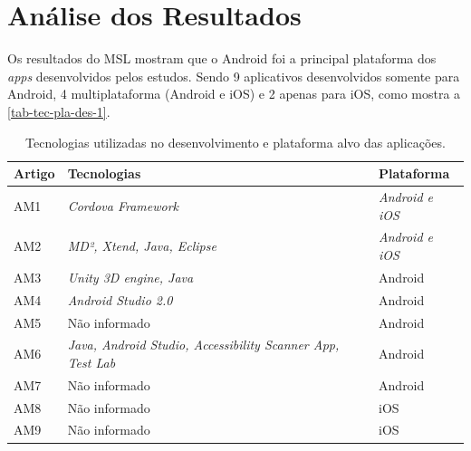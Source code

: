 \newpage

\section{Análise dos Resultados}

Os resultados do MSL mostram que o Android foi a principal plataforma dos \emph{apps} desenvolvidos pelos estudos.
Sendo 9 aplicativos desenvolvidos somente para Android, 4 multiplataforma (Android e iOS) e 2
apenas para iOS, como mostra a \autoref{tab-tec-pla-des-1}.

\begin{table}[htb]
    \begin{center}
        \caption{Tecnologias utilizadas no desenvolvimento e plataforma alvo das aplicações.}
        \label{tab-tec-pla-des-1}
        \begin{tabular}{p{1.0cm}|p{8.0cm}|p{3.0cm}}
            \textbf{Artigo} & \textbf{Tecnologias}                                             & \textbf{Plataforma}  \\
            \hline
            AM1             & \emph{Cordova Framework}                                         & \emph{Android e iOS} \\
            \hline
            AM2             & \emph{MD², Xtend, Java, Eclipse}                                 & \emph{Android e iOS} \\
            \hline
            AM3             & \emph{Unity 3D engine, Java}                                     & Android       \\
            \hline
            AM4             & \emph{Android Studio 2.0}                                        & Android       \\
            \hline
            AM5             & Não informado                                                    & Android       \\
            \hline
            AM6             & \emph{Java, Android Studio, Accessibility Scanner App, Test Lab} & Android       \\
            \hline
            AM7             & Não informado                                                    & Android       \\
            \hline
            AM8             & Não informado                                                    & iOS           \\
            \hline
            AM9             & Não informado                                                    & iOS           \\

\end{tabular}
\end{center}
\end{table}

